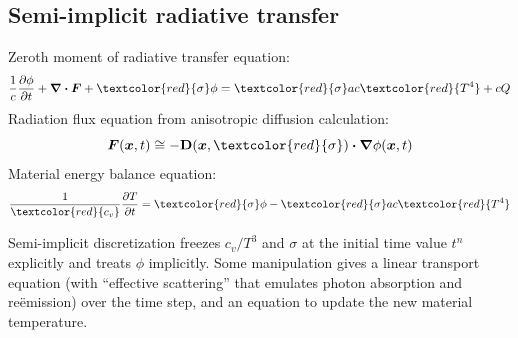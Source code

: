 \documentclass{beamer}
\newcommand{\Dtens}{\mat{D}}
\newcommand{\notebox}[1]{\hspace{.1\columnwidth}\colorbox{lightgray}{\parbox{0.8\columnwidth}{\small
#1}}}
\begin{document}
\subsection{Semi-implicit radiative transfer}
\begin{frame}
Zeroth moment of radiative transfer equation:
\begin{equation*}
  \frac{1}{c} \pder{\phi}{t}
  + \del \vd \vec{F} + \textcolor{red}{\sigma} \phi
  = \textcolor{red}{\sigma} ac\textcolor{red}{T^4}
  + c Q
\end{equation*}
Radiation flux equation from anisotropic diffusion calculation:
\begin{equation*}
 \vec{F}(\vec{x}, t) \cong - \Dtens(\vec{x},\textcolor{red}{\sigma})
  \vd \del \phi(\vec{x}, t)
\end{equation*}
Material energy balance equation:
\begin{equation*}
  \frac{1}{\textcolor{red}{c_v}}\pder{T}{t} = \textcolor{red}{\sigma} \phi -
  \textcolor{red}{\sigma} ac\textcolor{red}{T^4}
\end{equation*}

Semi-implicit discretization freezes $c_v/T^3$ and $\sigma$ at the initial time
value $t^n$ explicitly and treats $\phi$ implicitly. Some
manipulation gives a linear transport equation (with ``effective scattering''
that emulates photon absorption and re\"emission) over the time step, and an
equation to update the new material temperature.
%
\end{frame}

\end{document}
